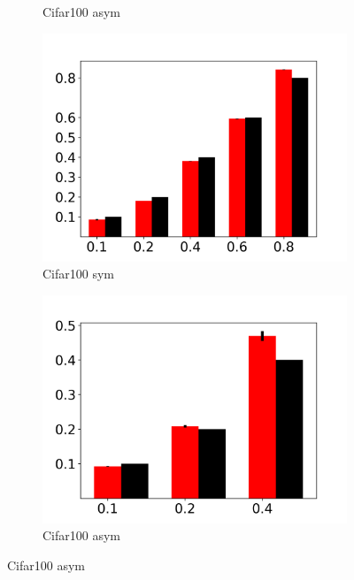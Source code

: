 \documentclass{article}
\begin{document}
\begin{figure}[b!]
\begin{subfigure}[b]{0.245\textwidth}
    \vspace{-.5cm}
        \caption{Cifar100 asym}
        \label{cifar_asym}
    \end{subfigure}
    \begin{subfigure}[b]{0.245\textwidth}
        \includegraphics[width=\textwidth]{figs/CIfa100NE_bar.png}
    \vspace{-.5cm}
        \caption{Cifar100 sym}
        \label{cifar_sym_2}
    \end{subfigure}
    \begin{subfigure}[b]{0.245\textwidth}
        \includegraphics[width=\textwidth]{figs/cifar100NE_asym1.png}
    \vspace{-.5cm}
        \caption{Cifar100 asym}
        \label{cifar_asym_2}
    \end{subfigure}


\end{figure}
\end{document}
